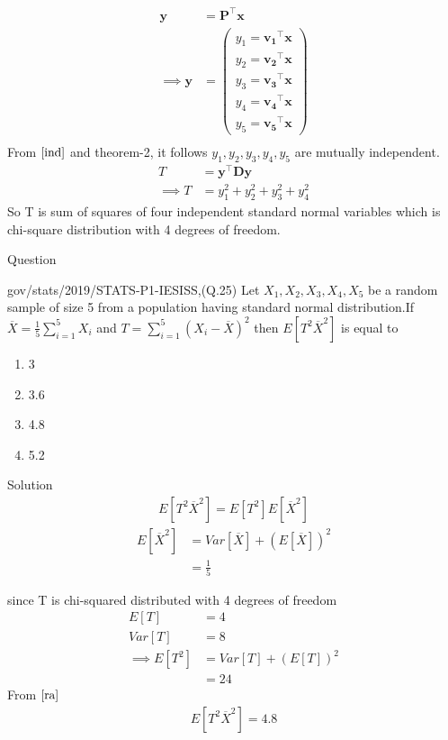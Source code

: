 \documentclass{beamer}
\renewcommand{\vec}[1]{\mathbf{#1}}
\providecommand{\brak}[1]{\ensuremath{\left(#1\right)}}
\newcommand{\myvec}[1]{\ensuremath{\begin{pmatrix}#1\end{pmatrix}}}
\providecommand{\mean}[1]{E[ #1 ]}
\providecommand{\sbrak}[1]{\ensuremath{{}\left[#1\right]}}
\begin{document}
\begin{frame}
    \begin{align}
    \vec{y}&=\vec{P}^{\top}\vec{x}\\
     \implies   \vec{y}&=\myvec{y_1=\vec{v_1}^{\top}\vec{x}\\
                       y_2=\vec{v_2}^{\top}\vec{x}\\
                       y_3=\vec{v_3}^{\top}\vec{x}\\
                       y_4=\vec{v_4}^{\top}\vec{x}\\
                       y_5=\vec{v_5}^{\top}\vec{x}}\\
    \end{align}
    From $\eqref{ind}$ and theorem-2, it follows $y_1,y_2,y_3,y_4,y_5$ are mutually independent.
    \begin{align}
         T&=\vec{y}^{\top}\vec{D}\vec{y}\\
        \implies T&=y_1^2+y_2^2+y_3^2+y_4^2 
    \end{align}
    So T is sum of squares of four independent standard normal variables which is chi-square distribution with 4 degrees of freedom.
\end{frame}
\begin{frame}{Question}
  \begin{block}{gov/stats/2019/STATS-P1-IESISS,(Q.25)}
   Let $X_1,X_2,X_3,X_4,X_5$ be a random sample of size 5 from a population having standard normal distribution.If 
$\overline{X}=\frac{1}{5}\sum_{i=1}^5 X_i$ and $T=\sum_{i=1}^5\brak{X_i-\overline{X}}^2$
then $\mean{T^2\overline{X}^2}$ is equal to 
\begin{enumerate}
    \item 3
    \item 3.6
    \item 4.8
    \item 5.2
\end{enumerate} 
  \end{block}  
\end{frame}
\begin{frame}{Solution}
   \begin{align}
    \mean{T^2\overline{X}^2}=\mean{T^2}\mean{\overline{X}^2}\label{ra}
\end{align}
\begin{align}
    \mean{\overline{X}^2}&=Var\sbrak{\overline{X}}+\brak{\mean{\overline{X}}}^2\\
    &=\frac{1}{5}
\end{align}

 since T is chi-squared distributed with 4 degrees of freedom
 \begin{align}
     \mean{T}&=4\\
     Var\sbrak{T}&=8\\
     \implies \mean{T^2}&=Var\sbrak{T}+\brak{\mean{T}}^2\\
    &=24
 \end{align}
 From $\eqref{ra}$
\begin{align}
    \mean{T^2\overline{X}^2}=4.8
\end{align} 
\end{frame}
\end{document}
